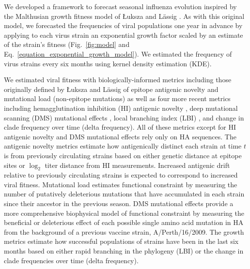 We developed a framework to forecast seasonal influenza evolution inspired by the Malthusian growth fitness model of {\L}uksza and L\"assig \cite{Luksza:2014hj}.
As with this original model, we forecasted the frequencies of viral populations one year in advance by applying to each virus strain an exponential growth factor scaled by an estimate of the strain's fitness (Fig.~\ref{fig:model} and Eq.~\ref{equation_exponential_growth_model}).
We estimated the frequency of virus strains every six months using kernel density estimation (KDE).

We estimated viral fitness with biologically-informed metrics including those originally defined by {\L}uksza and L\"assig \cite{Luksza:2014hj} of epitope antigenic novelty and mutational load (non-epitope mutations) as well as four more recent metrics including hemagglutination inhibition (HI) antigenic novelty \cite{Neher:2016hy}, deep mutational scanning (DMS) mutational effects \cite{Lee2018}, local branching index (LBI) \cite{Neher:2014eu}, and change in clade frequency over time (delta frequency).
All of these metrics except for HI antigenic novelty and DMS mutational effects rely only on HA sequences.
The antigenic novelty metrics estimate how antigenically distinct each strain at time $t$ is from previously circulating strains based on either genetic distance at epitope sites or $\log_{2}$ titer distance from HI measurements.
Increased antigenic drift relative to previously circulating strains is expected to correspond to increased viral fitness.
Mutational load estimates functional constraint by measuring the number of putatively deleterious mutations that have accumulated in each strain since their ancestor in the previous season.
DMS mutational effects provide a more comprehensive biophysical model of functional constraint by measuring the beneficial or deleterious effect of each possible single amino acid mutation in HA from the background of a previous vaccine strain, A/Perth/16/2009.
The growth metrics estimate how successful populations of strains have been in the last six months based on either rapid branching in the phylogeny (LBI) or the change in clade frequencies over time (delta frequency).

